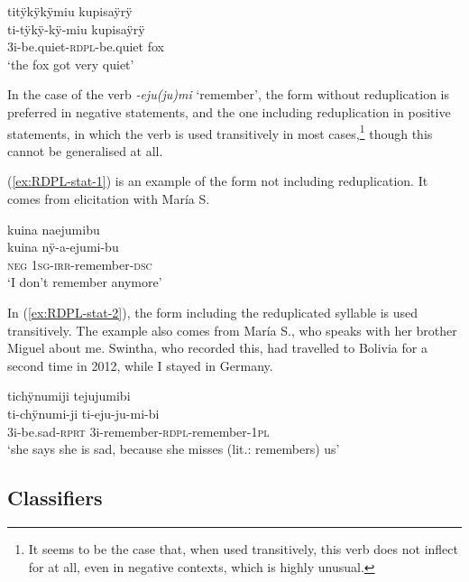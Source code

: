 \ea\label{ex:RDPL-stat}
\begingl
\glpreamble titÿkÿkÿmiu kupisaÿrÿ\\
\gla ti-tÿkÿ-kÿ-miu kupisaÿrÿ\\
\glb 3i-be.quiet-\textsc{rdpl}-be.quiet fox\\
\glft ‘the fox got very quiet’
\endgl
\trailingcitation{[jmx-n120429ls-x5.448]}
\xe

In the case of the verb \textit{-eju(ju)mi} ‘remember’, the form without reduplication is preferred in negative statements, and the one including reduplication in positive statements, in which the verb is used transitively in most cases,\footnote{It seems to be the case that, when used transitively, this verb does not inflect for  at all, even in negative contexts, which is highly unusual.} though this cannot be generalised at all.

(\ref{ex:RDPL-stat-1}) is an example of the form not including reduplication. It comes from elicitation with María S.

\ea\label{ex:RDPL-stat-1}
\begingl
\glpreamble kuina naejumibu\\
\gla kuina nÿ-a-ejumi-bu\\
\glb \textsc{neg} 1\textsc{sg}-\textsc{irr}-remember-\textsc{dsc}\\
\glft ‘I don’t remember anymore’
\endgl
\trailingcitation{[rxx-e181022le]}
\xe

In (\ref{ex:RDPL-stat-2}), the form including the reduplicated syllable is used transitively. The example also comes from María S., who speaks with her brother Miguel about me. Swintha, who recorded this, had travelled to Bolivia for a second time in 2012, while I stayed in Germany.

\ea\label{ex:RDPL-stat-2}
\begingl
\glpreamble tichÿnumiji tejujumibi\\
\gla ti-chÿnumi-ji ti-eju-ju-mi-bi\\
\glb 3i-be.sad-\textsc{rprt} 3i-remember-\textsc{rdpl}-remember-1\textsc{pl}\\
\glft ‘she says she is sad, because she misses (lit.: remembers) us’
\endgl
\trailingcitation{[rmx-c121126s.19]}
\xe


\subsection{Classifiers}\label{sec:StativeVerbs_CLF}

